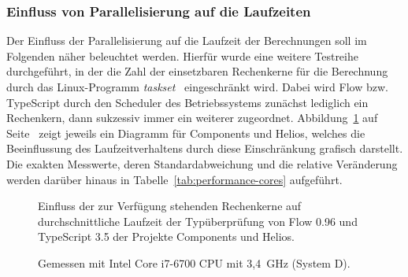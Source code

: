 \subsubsection{Einfluss von Parallelisierung auf die Laufzeiten}

Der Einfluss der Parallelisierung auf die Laufzeit der Berechnungen soll im Folgenden näher beleuchtet werden. Hierfür wurde eine weitere Testreihe durchgeführt, in der die Zahl der einsetzbaren Rechenkerne für die Berechnung durch das Linux-Programm \textit{taskset}~\autocite{TASKSET} eingeschränkt wird. Dabei wird Flow bzw. TypeScript durch den Scheduler des Betriebssystems zunächst lediglich ein Rechenkern, dann sukzessiv immer ein weiterer zugeordnet. Abbildung~\ref{fig:plot-cores} auf Seite~\pageref{fig:plot-cores} zeigt jeweils ein Diagramm für Components und Helios, welches die Beeinflussung des Laufzeitverhaltens durch diese Einschränkung grafisch darstellt. Die exakten Messwerte, deren Standardabweichung und die relative Veränderung werden darüber hinaus in Tabelle~\ref{tab:performance-cores} aufgeführt.

\tablespace


\begin{figure}[p]
  \centering

  

  \vspace{0.5\baselineskip}

  
  \vspace{0.5\baselineskip}
  \caption[Einfluss der zur Verfügung stehenden Rechenkerne auf durchschnittliche Laufzeit der Typüberprüfung von Flow und TypeScript]{
    Einfluss der zur Verfügung stehenden Rechenkerne auf durchschnittliche Laufzeit der Typüberprüfung von Flow 0.96 und TypeScript 3.5 der Projekte Components und Helios.
  }

  \vspace{0.75\baselineskip}
  \caption*{
    \small
    Gemessen mit Intel Core i7-6700 CPU mit 3,4~GHz (System D).
  }

  \label{fig:plot-cores}
\end{figure}

